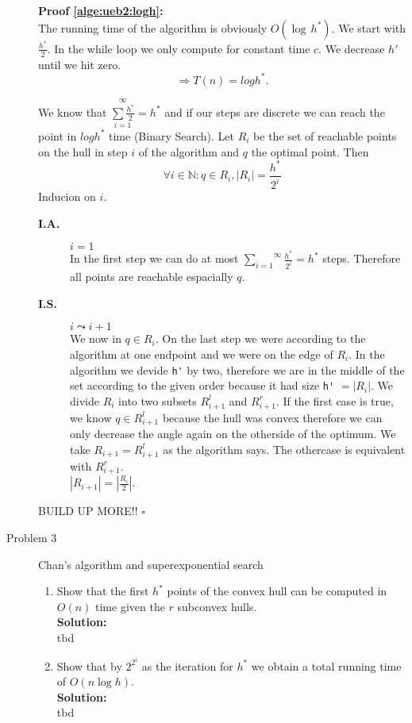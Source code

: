 \documentclass[11pt,a4paper,ngerman]{article}
\begin{document}
\begin{description}
\textbf{Proof \ref{alge:ueb2:logh}:}\\
The running time of the algorithm is obviously $O(\log \, h^*)$.
We start with $\frac{h^*}{2}$. In the while loop we only
compute for constant time $c$. We decrease $h'$ until we hit zero.
$$
\Rightarrow T(n) = log h^*.
$$

We know that $\overset{\infty}{\underset{i=1}{\sum \frac{h^*}{2}}} = h^*$
and if our steps are discrete we can reach the point in $log h^*$ time
(Binary Search).
Let $R_i$ be the set of reachable points on the hull in step $i$
of the algorithm and $q$ the optimal point. Then
$$
	\forall i \in \mathbb{N} : q \in R_i, |R_i| = \frac{h^*}{2^i}
$$
Inducion on $i$.
\begin{description}
	\item[\bfseries I.A.] $i=1$\\
	In the first step we can do at most 
	$\overset{\infty}{\underset{i=1}{\sum}} \frac{h^*}{2^i} = h^*$
	steps. Therefore all points are reachable espacially $q$.
	\item[\bfseries I.S.] $i \leadsto i+1$\\
	We now in $q \in R_i$. On the last step we were
	according to the algorithm at one endpoint and we were on the
	edge of $R_i$. In the algorithm we devide \lstinline|h'| by two,
	therefore we are in the middle of the set according to the given order
	because it had size \lstinline|h'| $= |R_i|$.
	We divide $R_i$ into two subsets $R_{i+1}^l$ and $R_{i+1}^r$.
	If the first case is true, we know $q \in R_{i+1}^l$ because
	the hull was convex therefore we can only decrease the angle again
	on the otherside of the optimum. We take $R_{i+1}=R_{i+1}^l$
	as the algorithm says. The othercase is equivalent with $R_{i+1}^r$.\\
	$|R_{i+1}| = |\frac{R_i}{2}|$.
\end{description}
BUILD UP MORE!!
\mbox{}\hfill$\square$



\item[Problem 3] Chan's algorithm and superexponential search
  \begin{enumerate}
    \item Show that the first $h^*$ points of the convex hull
	can be computed in $O(n)$ time given the $r$ subconvex hulls.\\
    \textbf{Solution:}\\
	tbd
    \item Show that by $2^{2^i}$ as the iteration for $h^*$ we obtain
	a total running time of $O(n \log h)$.\\
    \textbf{Solution:}\\
	tbd
  \end{enumerate}

\end{description}

\label{LastPage}
\end{document}
